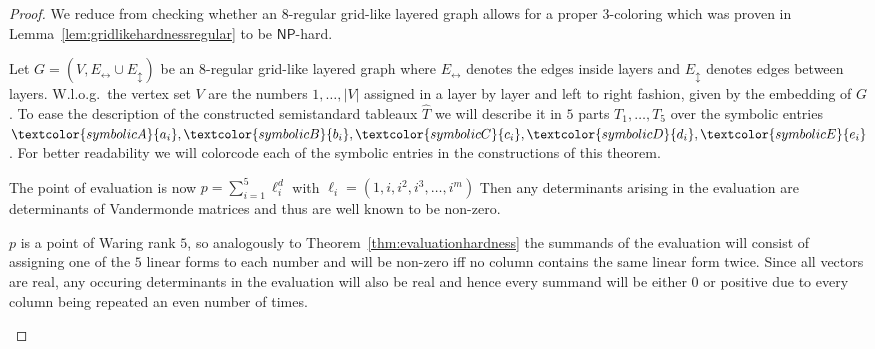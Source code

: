 \documentclass[10pt,a4paper]{article}
\numberwithin{equation}{section}
\theoremstyle{definition}
\newcommand{\NP}{\ensuremath{\mathsf{NP}}}
\newcommand{\Ehor}{{\ensuremath{E_{\leftrightarrow}}}}
\newcommand{\Evert}{{\ensuremath{E_{\updownarrow}}}}
\begin{document}
\begin{proof}

    We reduce from checking whether an $8$-regular grid-like layered graph allows for a proper $3$-coloring which was proven in Lemma~\ref{lem:gridlikehardnessregular} to be \NP-hard.

    Let $G = (V, \Ehor \cup \Evert)$ be an $8$-regular grid-like layered graph where $\Ehor$ denotes the edges inside layers and $\Evert$ denotes edges between layers.
    W.l.o.g.\ the vertex set $V$ are the numbers $1, \ldots, |V|$ assigned in a layer by layer and left to right fashion, given by the embedding of $G$.
    To ease the description of the constructed semistandard tableaux $\hat{T}$ we will describe it in $5$ parts $T_1, \ldots, T_5$ over the symbolic entries $\textcolor{symbolicA}{a_i}, \textcolor{symbolicB}{b_i}, \textcolor{symbolicC}{c_i}, \textcolor{symbolicD}{d_i}, \textcolor{symbolicE}{e_i}$.
    For better readability we will colorcode each of the symbolic entries in the constructions of this theorem.

    The point of evaluation is now $p = \sum_{i=1}^5 \ell_i^d$ with $\ell_i = (1, i, i^2, i^3, \ldots, i^m)$
    Then any determinants arising in the evaluation are determinants of Vandermonde matrices and thus are well known to be non-zero.
    
    $p$ is a point of Waring rank $5$, so analogously to Theorem~\ref{thm:evaluationhardness} the summands of the evaluation will consist of assigning one of the $5$ linear forms to each number and will be non-zero iff no column contains the same linear form twice.
    Since all vectors are real, any occuring determinants in the evaluation will also be real and hence every summand will be either $0$ or positive due to every column being repeated an even number of times.

    \begin{figure}[tpb]
        \centering
\end{figure}
\end{proof}
\end{document}
